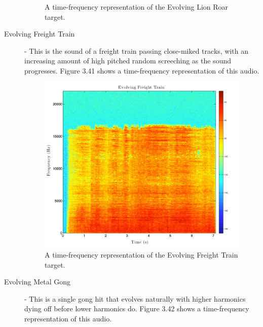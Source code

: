 \documentclass[a4paper,12pt]{report} 	%
\numberwithin{figure}{chapter}
\numberwithin{table}{chapter}
\numberwithin{equation}{chapter}
\begin{document}
\begin{flushleft}
\begin{description}
\begin{figure}[h!]
\begin{center}
\caption[Evolving Lion Roar Time-Frequency Representation]{A time-frequency representation of the Evolving Lion Roar target.}
\end{center}
\end{figure}
\item[Evolving Freight Train] - This is the sound of a freight train passing close-miked tracks, with an increasing amount of high pitched random screeching as the sound progresses. Figure 3.41 shows a time-frequency representation of this audio.
\begin{figure}[h!]
\begin{center}
\includegraphics[scale=0.35,width=\linewidth]{EvolvingFreightTrain}
\caption[Evolving Freight Train Time-Frequency Representation]{A time-frequency representation of the Evolving Freight Train target.}
\end{center}
\end{figure}
\item[Evolving Metal Gong] - This is a single gong hit that evolves naturally with higher harmonics dying off before lower harmonics do. Figure 3.42 shows a time-frequency representation of this audio.
\begin{figure}[h!]
\begin{center}

\end{center}
\end{figure}
\end{description}
\end{flushleft}
\end{document}
